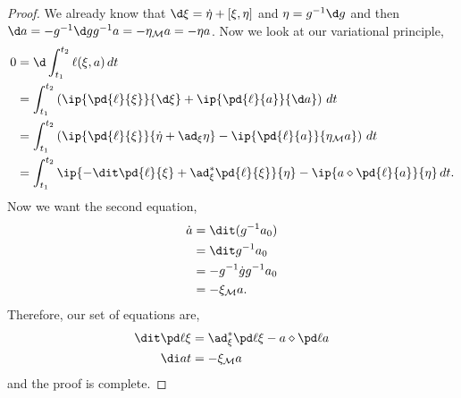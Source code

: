 \begin{proof}
  We already know that $\d \xi = \dot \eta + [\xi, \eta]$ and $\eta = g^{-1}\d g$ and then $\d a = -g^{-1}\d g g^{-1} a = -\eta_{\mathcal{M}} a = -\eta a$. Now we look at our variational principle,
  \begin{align*}
    0 &= \d\int_{t_1}^{t_2} \ell(\xi, a)\, dt \\
    &= \int_{t_1}^{t_2} \left(\ip{\pd{\ell}{\xi}}{\d \xi} + \ip{\pd{\ell}{a}}{\d a}\right)\, dt \\
    &= \int_{t_1}^{t_2} \left(\ip{\pd{\ell}{\xi}}{\dot \eta + \ad_{\xi} \eta} - \ip{\pd{\ell}{a}}{\eta_\mathcal{M}a}\right)\, dt \\
    &= \int_{t_1}^{t_2} \ip{ -\dit \pd{\ell}{\xi} + \ad^*_\xi \pd{\ell}{\xi}}{\eta} - \ip{a \diamond \pd{\ell}{a}}{\eta}\, dt.
  \end{align*}
  Now we want the second equation,
  \begin{align*}
    \dot a &= \dit (g^{-1}a_0) \\
    &= \dit g^{-1} a_0 \\
    &= -g^{-1}\dot g g^{-1} a_0 \\
    &= -\xi_\mathcal{M} a.
  \end{align*}
  Therefore, our set of equations are,
  \begin{align}
    \dit\pd \ell \xi &= \ad^*_\xi \pd \ell \xi - a\diamond \pd \ell a\\
    \di a t &= -\xi_\mathcal{M}a
  \end{align}
  and the proof is complete.
\end{proof}

